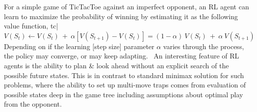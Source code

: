 For a simple game of TicTacToe against an imperfect opponent, an RL agent can learn to maximize the probability of winning by estimating it as the following value function,
tc| \( V(S_t) \leftarrow V(S_t) \ + \ \alpha[V(S_{t+1}) - V(S_t)] = (1 - \alpha) \ V(S_t) \ + \ \alpha \ V(S_{t+1}) \)
Depending on if the learning [step size] parameter \(\alpha\) varies through the process, the policy may converge, or may keep adapting. 
An interesting feature of RL agents is the ability to plan & look ahead without an explicit search of the possible future states. This is in contrast to standard minimax solution for such problems, where the ability to set up multi-move traps comes from evaluation of possible states deep in the game tree including assumptions about optimal play from the opponent.
